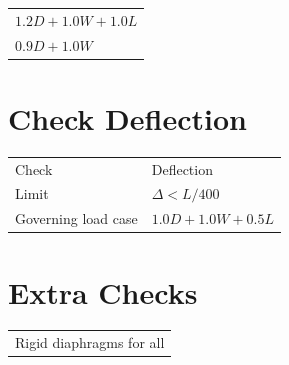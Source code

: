 \documentclass[10pt]{article}
\begin{document}

{\ttfamily\footnotesize
\begin{tabular}{@{}p{6.9in}@{}}
$1.2D + 1.0W + 1.0L$ \\
$0.9D + 1.0W$ \\
\end{tabular}
}

\section{Check Deflection}

{\ttfamily\footnotesize
\begin{tabular}{@{}p{2.2in}p{4.2in}@{}}
Check & Deflection \\
Limit & $\Delta < L/400$ \\
Governing load case & $1.0D + 1.0W + 0.5L$ \\
\end{tabular}
}

\section{Extra Checks}

{\ttfamily\footnotesize
\begin{tabular}{@{}p{6.9in}@{}}
Rigid diaphragms for all \\
\end{tabular}
}
\end{document}
